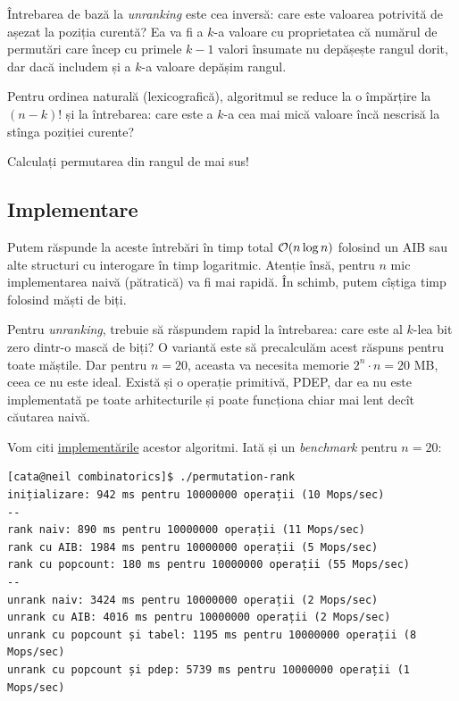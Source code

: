 \documentclass[../main.tex]{subfiles}
\begin{document}
Întrebarea de bază la \textit{unranking} este cea inversă: care este valoarea potrivită de așezat la poziția curentă? Ea va fi a $k$-a valoare cu proprietatea că numărul de permutări care încep cu primele $k-1$ valori însumate nu depășește rangul dorit, dar dacă includem și a $k$-a valoare depășim rangul.

Pentru ordinea naturală (lexicografică), algoritmul se reduce la o împărțire la $(n-k)!$ și la întrebarea: care este a $k$-a cea mai mică valoare încă nescrisă la stînga poziției curente?

Calculați permutarea din rangul de mai sus!

\subsection{Implementare}

Putem răspunde la aceste întrebări în timp total $\mathcal{O}(n \log n)$ folosind un AIB sau alte structuri cu interogare în timp logaritmic. Atenție însă, pentru $n$ mic implementarea naivă (pătratică) va fi mai rapidă. În schimb, putem cîștiga timp folosind măști de biți.

Pentru \textit{unranking}, trebuie să răspundem rapid la întrebarea: care este al $k$-lea bit zero dintr-o mască de biți? O variantă este să precalculăm acest răspuns pentru toate măștile. Dar pentru $n = 20$, aceasta va necesita memorie $2^n \cdot n = 20$ MB, ceea ce nu este ideal. Există și o operație primitivă, PDEP, dar ea nu este implementată pe toate arhitecturile și poate funcționa chiar mai lent decît căutarea naivă.

\label{problem:math-perm-rank}

Vom citi \hyperref[code:math-perm-rank]{implementările} acestor algoritmi. Iată și un \textit{benchmark} pentru $n = 20$:

\begin{verbatim}
[cata@neil combinatorics]$ ./permutation-rank
inițializare: 942 ms pentru 10000000 operații (10 Mops/sec)
--
rank naiv: 890 ms pentru 10000000 operații (11 Mops/sec)
rank cu AIB: 1984 ms pentru 10000000 operații (5 Mops/sec)
rank cu popcount: 180 ms pentru 10000000 operații (55 Mops/sec)
--
unrank naiv: 3424 ms pentru 10000000 operații (2 Mops/sec)
unrank cu AIB: 4016 ms pentru 10000000 operații (2 Mops/sec)
unrank cu popcount și tabel: 1195 ms pentru 10000000 operații (8 Mops/sec)
unrank cu popcount și pdep: 5739 ms pentru 10000000 operații (1 Mops/sec)
\end{verbatim}
\end{document}
